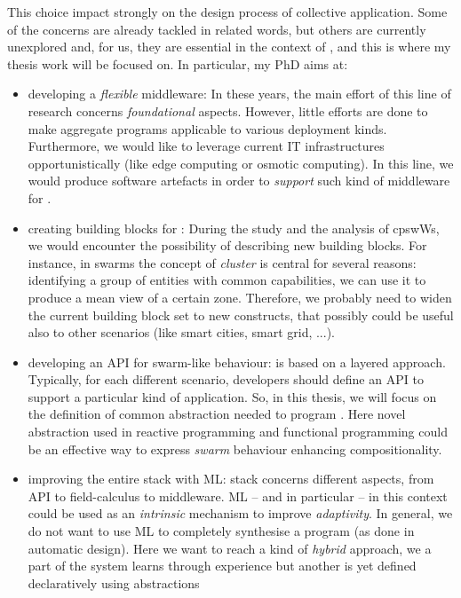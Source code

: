\documentclass[11pt]{article}
\begin{document}
This choice impact strongly on the design process of collective application. Some of the concerns are already tackled in related words, but others are currently unexplored and, for us, they are essential in the context of \cpsw{}, and this is where my thesis work will be focused on.
In particular, my PhD aims at:
\begin{itemize}
	\item developing a \textit{flexible} middleware: In these years, the main effort of this line of research concerns \textit{foundational} aspects. However, little efforts are done to make aggregate programs applicable to various deployment kinds. Furthermore, we would like to leverage current IT infrastructures opportunistically (like edge computing or osmotic computing). In this line, we would produce software artefacts in order to \textit{support} such kind of middleware for \cpsw{}.
	\item creating building blocks for \cpsw{}: During the study and the analysis of cpswWs, we would encounter the possibility of describing new building blocks. For instance, in swarms the concept of \emph{cluster} is central for several reasons: identifying a group of entities with common capabilities, we can use it to produce a mean view of a certain zone. Therefore, we probably need to widen the current building block set to new constructs, that possibly could be useful also to other scenarios (like smart cities, smart grid, ...).
	\item developing an API for swarm-like behaviour: \ac{} is based on a layered approach. Typically, for each different scenario, developers should define an API to support a particular kind of application. So, in this thesis, we will focus on the definition of common abstraction needed to program \cpsw{}. Here novel abstraction used in reactive programming and functional programming could be an effective way to express \textit{swarm} behaviour enhancing compositionality.
	\item improving the entire \ac{} stack with ML: \ac{} stack concerns different aspects, from API to field-calculus to middleware. ML -- and in particular \rl{} -- in this context could be used as an \emph{intrinsic} mechanism to improve \emph{adaptivity}. In general, we do not want to use ML to completely synthesise a program (as done in automatic design). Here we want to reach a kind of \textit{hybrid} approach, we a part of the system learns through experience but another is yet defined declaratively using \ac{} abstractions
\end{itemize}
\end{document}
